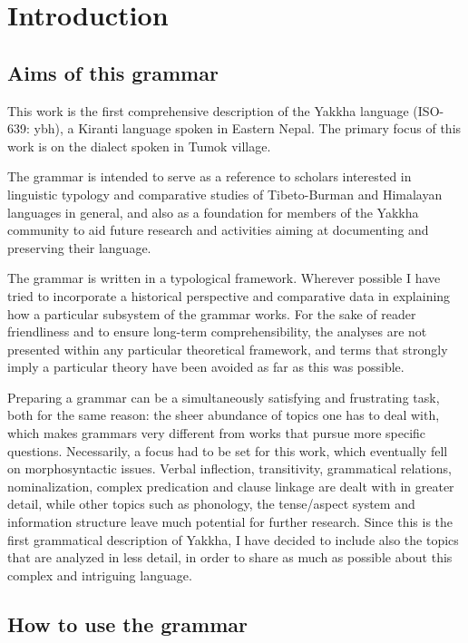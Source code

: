 ﻿\chapter{Introduction}\label{grammar-intro}

\section{Aims of this grammar}

This work is the first comprehensive description of the Yakkha language  (ISO-639: ybh), a Kiranti language spoken in Eastern Nepal. The primary focus of this work is on the dialect spoken in Tumok village. 

The grammar is intended to serve as a reference to scholars interested in linguistic typology and comparative studies of Tibeto-Burman and Himalayan languages in general, and also as a foundation for members of the Yakkha community to aid future research and activities aiming at documenting and preserving their language. 

The grammar is written in a typological framework.  Wherever possible I have tried to incorporate a historical perspective and comparative data in explaining how a particular subsystem of the grammar works. For the sake of reader friendliness and to ensure long-term comprehensibility, the analyses are not presented within any particular theoretical framework, and terms that strongly imply a particular theory have been avoided as far as this was possible.  

Preparing a grammar can be a simultaneously  satisfying and frustrating task, both for the same reason: the sheer abundance of topics one has to deal with, which makes grammars very different from works that pursue more specific questions. Necessarily, a focus had to be set for this work, which eventually fell on morphosyntactic issues. Verbal inflection, transitivity, grammatical relations, nominalization, complex predication and clause linkage are dealt with in greater detail, while other topics such as phonology, the tense/aspect system and information structure leave much potential for further research. Since this is the first grammatical description of Yakkha, I have decided to include also the topics that are analyzed in less detail, in order to share as much as possible about this complex and intriguing language.


\section{How to use the grammar}\label{how-to}
